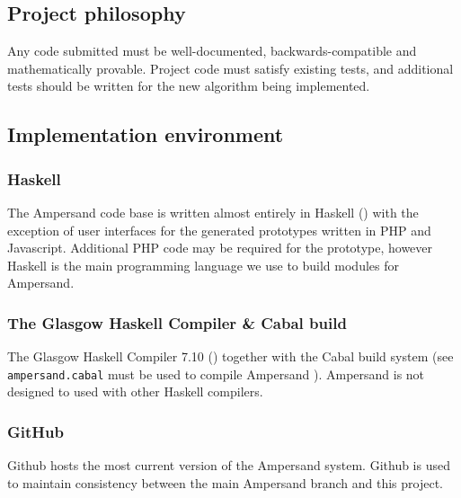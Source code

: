 \documentclass[12pt]{report}
\begin{document}
\subsection{Project philosophy}

Any code submitted must be well-documented, backwards-compatible and 
mathematically provable. Project code must satisfy existing tests, and 
additional tests should be written for the new algorithm being implemented. 


\subsection{Implementation environment}\label{subsec:ImplementationEnvironment}
\subsubsection*{Haskell}
The Ampersand code base is written almost entirely in Haskell 
(\cite{ampSource}) with the exception of user interfaces for the generated 
prototypes written in PHP and Javascript. Additional PHP code may be required 
for the prototype, however Haskell is the main programming 
language we use to build modules for Ampersand. 

\subsubsection*{The Glasgow Haskell Compiler \& Cabal build}\label{GHC}
The Glasgow Haskell Compiler 7.10 (\cite{GHC}) together with the Cabal build 
system (see \verb|ampersand.cabal| must be used to compile Ampersand 
\cite{ampSource}). Ampersand is not designed to used with other Haskell 
compilers.




\subsubsection*{GitHub}\label{Github}
Github hosts the most current version of the Ampersand system. Github is used 
to maintain consistency between the main Ampersand branch and this project.

%
\end{document}
